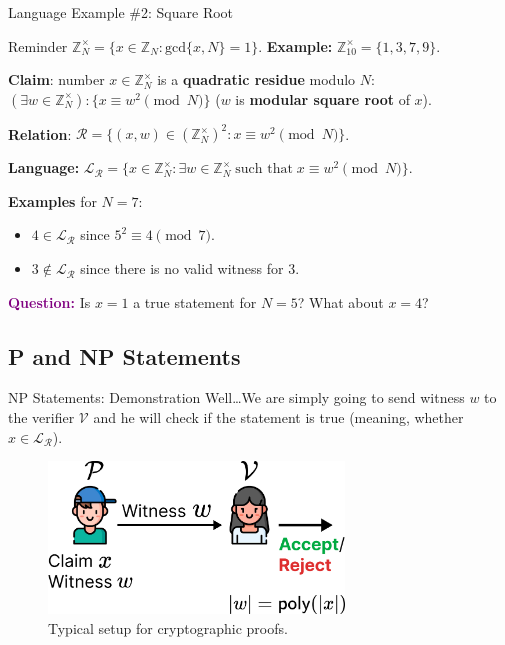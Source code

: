 \documentclass{zkdl-presentation-template}
\begin{document}
    \begin{frame}{Language Example \#2: Square Root}
        \begin{block}{Reminder}
            $\mathbb{Z}_N^{\times} = \{x \in \mathbb{Z}_N: \text{gcd}\{x,N\}=1\}$. \textbf{Example:} $\mathbb{Z}_{10}^{\times} = \{1,3,7,9\}$.\pause
        \end{block}

        \begin{example}
            \textbf{Claim}: number $x \in \mathbb{Z}_N^{\times}$ is a \textbf{quadratic residue} modulo $N$: $(\exists w \in \mathbb{Z}_N^{\times}): \{x \equiv w^2 \pmod{N}\}$ ($w$ is \textbf{modular square root} of $x$). \pause
            
            \textbf{Relation}: $\mathcal{R} = \{ (x, w) \in (\mathbb{Z}_N^{\times})^2: x \equiv w^2 \pmod{N} \}$. \pause
        
            \textbf{Language:} $\mathcal{L}_{\mathcal{R}} = \{x \in \mathbb{Z}_N^{\times}: \exists w \in \mathbb{Z}_N^{\times} \; \text{such that} \; x \equiv w^2 \pmod{N}\}$. \pause
            
            \textbf{Examples} for $N=7$: 
            \begin{itemize}
                \item $4 \in \mathcal{L}_{\mathcal{R}}$ since $5^2 \equiv 4 \pmod{7}$. \pause
                \item $3 \not\in \mathcal{L}_{\mathcal{R}}$ since there is no valid witness for $3$. \pause
            \end{itemize}
        \end{example}

        \textcolor{purple}{\textbf{Question:}} Is $x=1$ a true statement for $N=5$? What about $x=4$?
    \end{frame}

    \subsection{P and NP Statements}

    \begin{frame}{NP Statements: Demonstration}
        Well\ldots We are simply going to send witness $w$ to the verifier $\mathcal{V}$ and he will check if the statement is true (meaning, whether $x \in \mathcal{L}_{\mathcal{R}}$).

        \begin{figure}
            \centering
            \includegraphics[width=0.7\textwidth]{images/lecture_6/np.pdf}
            \caption{Typical setup for cryptographic proofs.}
        \end{figure}
    \end{frame}
\end{document}

